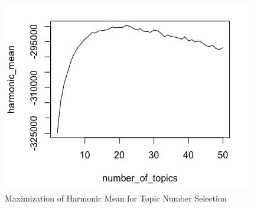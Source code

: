 \documentclass[12pt]{article}
\begin{document}
\begin{figure} [!h]
\centering
\includegraphics[scale=0.6]{harmonic_mean}
\caption{Maximization of Harmonic Mean for Topic Number Selection}
\end{figure}
\end{document}
